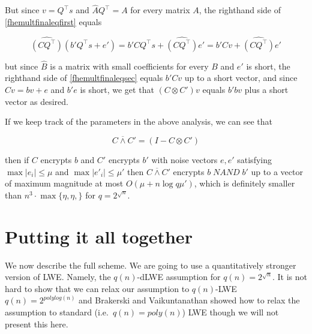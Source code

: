 But since \(v=Q^\top s\) and \(\hat{A}Q^\top = A\) for every matrix
\(A\), the righthand side of \eqref{fhemultfinaleqfirst} equals

\[\widehat{(\ensuremath{\mathit{CQ}}^\top)}(b'Q^\top s+e')=b'C Q^\top s+\widehat{(\ensuremath{\mathit{CQ}}^\top)}e' = b'Cv + \widehat{(\ensuremath{\mathit{CQ}}^\top)}e' \label{fhemultfinaleqsec}\]

but since \(\widehat{B}\) is a matrix with small coefficients for every
\(B\) and \(e'\) is short, the righthand side of
\eqref{fhemultfinaleqsec} equals \(b'Cv\) up to a short vector, and
since \(Cv=bv+e\) and \(b'e\) is short, we get that \((C\otimes C')v\)
equals \(b'bv\) plus a short vector as desired.

If we keep track of the parameters in the above analysis, we can see
that

\begin{equation*}
C \overline{\wedge} C' = (I - C \otimes C')
\end{equation*}

then if \(C\) encrypts \(b\) and \(C'\) encrypts \(b'\) with noise
vectors \(e,e'\) satisfying \(\max |e_i| \leq \mu\) and
\(\max |e'_i| \leq \mu'\) then \(C \overline{\wedge} C'\) encrypts
\(b \; \ensuremath{\mathit{NAND}}\; b'\) up to a vector of maximum
magnitude at most \(O(\mu + n\log q \mu')\), which is definitely smaller
than \(n^3\cdot \max\{\eta,\eta,\}\) for \(q=2^{\sqrt{n}}\).

\section{Putting it all together}\label{17-Putting-it-all-togethe}

We now describe the full scheme. We are going to use a quantitatively
stronger version of LWE. Namely, the \(q(n)\)-dLWE assumption for
\(q(n)=2^{\sqrt{n}}\). It is not hard to show that we can relax our
assumption to \(q(n)\)-LWE \(q(n)=2^{polylog(n)}\) and Brakerski and
Vaikuntanathan showed how to relax the assumption to standard
(i.e.~\(q(n)=poly(n)\)) LWE though we will not present this here.

